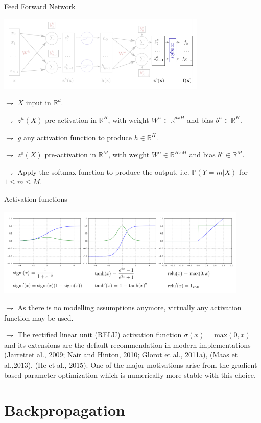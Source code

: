 \documentclass[9pt]{beamer}
\newcommand\R{\mathds{R}}
\begin{document}
\begin{frame}{Feed Forward Network}

\begin{center}
\includegraphics[width = 0.75\textwidth]{ffnn4.png}
\end{center}

$\rightharpoondown$ $X$ \alert{input in $\R^d$}.

$\rightharpoondown$ $z^h(X)$ \alert{pre-activation in $\R^H$}, with \alert{weight $W^h\in\R^{dxH}$} and \alert{bias $b^h\in\R^H$}.

$\rightharpoondown$ $g$ \alert{any activation function} to produce $h\in\R^H$.

$\rightharpoondown$ $z^o(X)$ \alert{pre-activation in $\R^M$}, with \alert{weight $W^o\in\R^{HxM}$} and \alert{bias $b^o\in\R^M$}.

$\rightharpoondown$  Apply the \alert{softmax function to produce the output}, i.e. $\mathbb{P}(Y=m|X)$ for $1\leqslant m \leqslant M$.
\end{frame}

\begin{frame}{Activation functions}

\begin{center}
\includegraphics[width = 0.9\textwidth]{activations.png}
\end{center}

$\rightharpoondown$ As there is no modelling assumptions anymore, \alert{virtually any activation function} may be used. 

$\rightharpoondown$ The rectified linear unit (RELU) activation function $\sigma(x) = \mathrm{max}(0,x)$ and its extensions are the default recommendation in modern implementations  (Jarrettet al., 2009; Nair and Hinton, 2010; Glorot et al., 2011a), (Maas et al.,2013),  (He et al., 2015). One of the major motivations arise from the \alert{gradient based parameter optimization which is numerically more stable with this choice}. 

\end{frame}


\section{Backpropagation}
\end{document}
